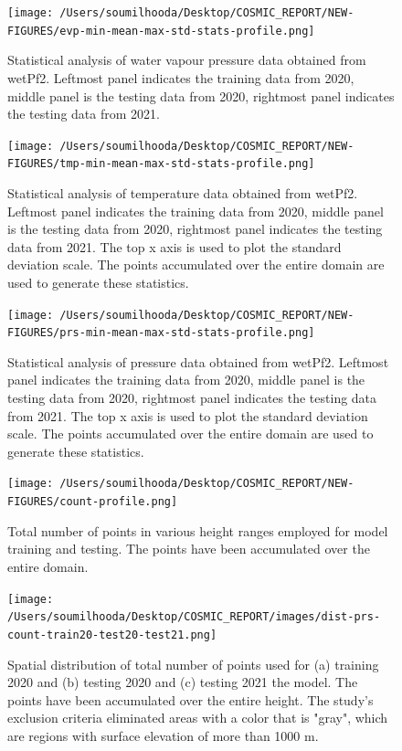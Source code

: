 \documentclass[a4paper,12pt,twoside]{article}
\begin{document}
\begin{figure}[H]
	\texttt{[image: /Users/soumilhooda/Desktop/COSMIC\_REPORT/NEW-FIGURES/evp-min-mean-max-std-stats-profile.png]}
	\caption{Statistical analysis of water vapour pressure data obtained from wetPf2. Leftmost panel indicates the training data from 2020, middle panel is the testing data from 2020, rightmost panel indicates the testing data from 2021. }
	\label{fig:img2}
\end{figure}
\begin{figure}[H]
	\texttt{[image: /Users/soumilhooda/Desktop/COSMIC\_REPORT/NEW-FIGURES/tmp-min-mean-max-std-stats-profile.png]}
	\caption{Statistical analysis of temperature data obtained from wetPf2. Leftmost panel indicates the training data from 2020, middle panel is the testing data from 2020, rightmost panel indicates the testing data from 2021. The top x axis is used to plot the standard deviation scale. The points accumulated over the entire domain are used to generate these statistics.}
	\label{fig:img3}
\end{figure}
\begin{figure}[H]
	\texttt{[image: /Users/soumilhooda/Desktop/COSMIC\_REPORT/NEW-FIGURES/prs-min-mean-max-std-stats-profile.png]}
	\caption{Statistical analysis of pressure data obtained from wetPf2. Leftmost panel indicates the training data from 2020, middle panel is the testing data from 2020, rightmost panel indicates the testing data from 2021. The top x axis is used to plot the standard deviation scale. The points accumulated over the entire domain are used to generate these statistics.}
	\label{fig:img4}
\end{figure}


\begin{figure}[H]
	\centering
		\texttt{[image: /Users/soumilhooda/Desktop/COSMIC\_REPORT/NEW-FIGURES/count-profile.png]}
		\caption{Total number of points in various height ranges employed for model training and testing. The points have been accumulated over the entire domain.}
		\label{fig:img9}
\end{figure}
\begin{figure}[H]
		\centering
	\texttt{[image: /Users/soumilhooda/Desktop/COSMIC\_REPORT/images/dist-prs-count-train20-test20-test21.png]}
	\caption{Spatial distribution of total number of points used for (a) training 2020 and (b) testing 2020 and (c) testing 2021 the model. The points have been accumulated over the entire height. The study's exclusion criteria eliminated areas with a color that is "gray", which are regions with surface elevation of more than 1000 m.}
	\label{fig:img22}
\end{figure}
\end{document}
